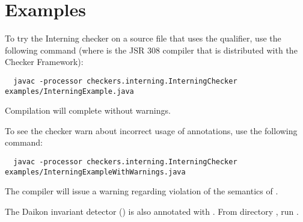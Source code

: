 \section{Examples\label{interning-example}}

To try the Interning checker on a source file that uses the  qualifier,
use the following command (where  is the JSR 308 compiler that
is distributed with the Checker Framework):

\begin{Verbatim}
  javac -processor checkers.interning.InterningChecker examples/InterningExample.java
\end{Verbatim}

\noindent
Compilation will complete without warnings.

To see the checker warn about incorrect usage of annotations, use the following
command:

\begin{Verbatim}
  javac -processor checkers.interning.InterningChecker examples/InterningExampleWithWarnings.java
\end{Verbatim}

\noindent
The compiler will issue a warning regarding violation of the semantics of
.


The Daikon invariant detector
() is also annotated with
.  From directory ,
run .



